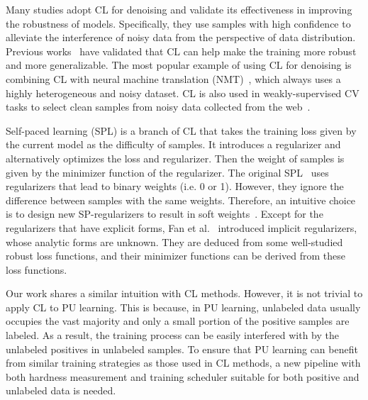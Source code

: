 \documentclass[sigconf]{acmart}
\begin{document}
Many studies adopt CL for denoising and validate its effectiveness in improving the robustness of models. Specifically, they use samples with high confidence to alleviate the interference of noisy data from the perspective of data distribution. Previous works~\cite{zhou2021robust} have validated that CL can help make the training more robust and more generalizable. The most popular example of using CL for denoising is combining CL with neural machine translation (NMT)~\cite{kumar2019reinforcement}, which always uses a highly heterogeneous and noisy dataset. CL is also used in weakly-supervised CV tasks to select clean samples from noisy data collected from the web~\cite{guo2018curriculumnet}.

Self-paced learning (SPL) is a branch of CL that takes the training loss given by the current model as the difficulty of samples. It introduces a regularizer and alternatively optimizes the loss and regularizer. Then the weight of samples is given by the minimizer function of the regularizer. The original SPL~\cite{kumar2010self} uses regularizers that lead to binary weights (i.e. 0 or 1). However, they ignore the difference between samples with the same weights. Therefore, an intuitive choice is to design new SP-regularizers to result in soft weights~\cite{jiang2014easy}. Except for the regularizers that have explicit forms, Fan et al.~\cite{fan2017self} introduced implicit regularizers, whose analytic forms are unknown.
They are deduced from some well-studied robust loss functions, and their minimizer functions can be derived from these loss functions.

Our work shares a similar intuition with CL methods. However, it is not trivial to apply CL to PU learning. This is because, in PU learning, unlabeled data usually occupies the vast majority and only a small portion of the positive samples are labeled.
As a result, the training process can be easily interfered with by the unlabeled positives in unlabeled samples. To ensure that PU learning can benefit from similar training strategies as those used in CL methods, a new pipeline with both hardness measurement and training scheduler suitable for both positive and unlabeled data is needed. 



\end{document}
